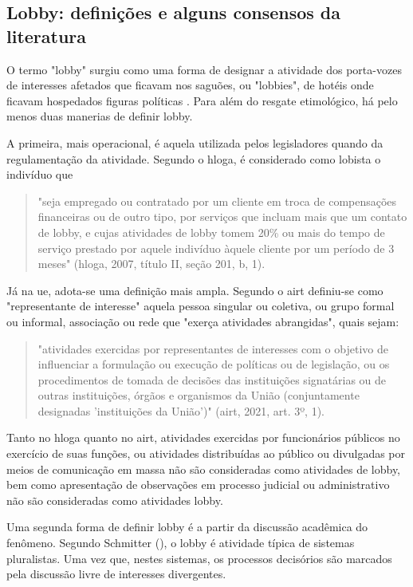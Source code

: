 \subsection{Lobby: definições e alguns consensos da literatura}
\label{subsection:lobbydef}
O termo "lobby" surgiu como uma forma de designar a atividade dos porta-vozes de interesses afetados que ficavam nos saguões, ou "lobbies", de hotéis onde ficavam hospedados figuras políticas \cite{mancuso2018}. Para além do resgate etimológico, há pelo menos duas manerias de definir lobby.

A primeira, mais operacional, é aquela utilizada pelos legisladores quando da regulamentação da atividade. Segundo o \acrfull{hloga}, é considerado como lobista o indivíduo que 

\begin{quote}
"seja empregado ou contratado por um cliente em troca de compensações financeiras ou de outro tipo, por serviços que incluam mais que um contato de lobby, e cujas atividades de lobby tomem 20\% ou mais do tempo de serviço prestado por aquele indivíduo àquele cliente por um período de 3 meses" (\acrshort{hloga}, 2007, título II, seção 201, b, 1).
\end{quote}

Já na \acrshort{ue}, adota-se uma definição mais ampla. Segundo o \acrfull{airt} definiu-se como "representante de interesse" aquela pessoa singular ou coletiva, ou grupo formal ou informal, associação ou rede que "exerça atividades abrangidas", quais sejam: 
\begin{quote}
"atividades exercidas por representantes de interesses com o objetivo de influenciar a formulação ou execução de políticas ou de legislação, ou os procedimentos de tomada de decisões das instituições signatárias ou de outras instituições, órgãos e organismos da União (conjuntamente designadas 'instituições da União')" (\acrshort{airt}, 2021, art. 3º, 1).
\end{quote}

Tanto no \acrshort{hloga} quanto no \acrshort{airt}, atividades exercidas por funcionários públicos no exercício de suas funções, ou atividades distribuídas ao público ou divulgadas por meios de comunicação em massa não são consideradas como atividades de lobby, bem como apresentação de observações em processo judicial ou administrativo não são consideradas como atividades lobby. 

Uma segunda forma de definir lobby é a partir da discussão acadêmica do fenômeno. Segundo Schmitter (\citeyear{schmitter1974still}), o lobby é atividade típica de sistemas pluralistas. Uma vez que, nestes sistemas, os processos decisórios são marcados pela discussão livre de interesses divergentes. 

